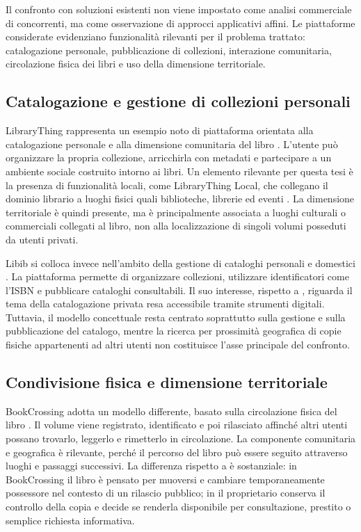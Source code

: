 Il confronto con soluzioni esistenti non viene impostato come analisi commerciale di concorrenti, ma come osservazione di approcci applicativi affini. Le piattaforme considerate evidenziano funzionalità rilevanti per il problema trattato: catalogazione personale, pubblicazione di collezioni, interazione comunitaria, circolazione fisica dei libri e uso della dimensione territoriale.

\subsection{Catalogazione e gestione di collezioni personali}
\label{subsec:catalogazione-collezioni}

LibraryThing rappresenta un esempio noto di piattaforma orientata alla catalogazione personale e alla dimensione comunitaria del libro \cite{librarything}. L'utente può organizzare la propria collezione, arricchirla con metadati e partecipare a un ambiente sociale costruito intorno ai libri. Un elemento rilevante per questa tesi è la presenza di funzionalità locali, come LibraryThing Local, che collegano il dominio librario a luoghi fisici quali biblioteche, librerie ed eventi \cite{librarythinglocal}. La dimensione territoriale è quindi presente, ma è principalmente associata a luoghi culturali o commerciali collegati al libro, non alla localizzazione di singoli volumi posseduti da utenti privati.

Libib si colloca invece nell'ambito della gestione di cataloghi personali e domestici \cite{libib}. La piattaforma permette di organizzare collezioni, utilizzare identificatori come l'ISBN e pubblicare cataloghi consultabili. Il suo interesse, rispetto a \projectname{}, riguarda il tema della catalogazione privata resa accessibile tramite strumenti digitali. Tuttavia, il modello concettuale resta centrato soprattutto sulla gestione e sulla pubblicazione del catalogo, mentre la ricerca per prossimità geografica di copie fisiche appartenenti ad altri utenti non costituisce l'asse principale del confronto.

\subsection{Condivisione fisica e dimensione territoriale}
\label{subsec:condivisione-territoriale}

BookCrossing adotta un modello differente, basato sulla circolazione fisica del libro \cite{bookcrossing}. Il volume viene registrato, identificato e poi rilasciato affinché altri utenti possano trovarlo, leggerlo e rimetterlo in circolazione. La componente comunitaria e geografica è rilevante, perché il percorso del libro può essere seguito attraverso luoghi e passaggi successivi. La differenza rispetto a \projectname{} è sostanziale: in BookCrossing il libro è pensato per muoversi e cambiare temporaneamente possessore nel contesto di un rilascio pubblico; in \projectname{} il proprietario conserva il controllo della copia e decide se renderla disponibile per consultazione, prestito o semplice richiesta informativa.

